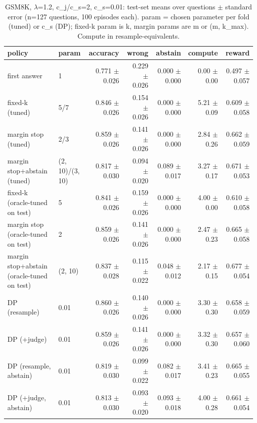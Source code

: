 \begin{table}[t]
\centering
\small
\caption{GSM8K, $\lambda$=1.2, c\_j/c\_s=2, c\_s=0.01: test-set means over questions $\pm$ standard error (n=127 questions, 100 episodes each). param = chosen parameter per fold (tuned) or c\_s (DP); fixed-k param is k, margin params are m or (m, k\_max). Compute in resample-equivalents.}
\label{tab:headline_gsm8k_lam1.2_jr2}
\begin{tabular}{llrrrrr}
\toprule
policy & param & accuracy & wrong & abstain & compute & reward \\
\midrule
first answer & 1 & 0.771 $\pm$ 0.026 & 0.229 $\pm$ 0.026 & 0.000 $\pm$ 0.000 & 0.00 $\pm$ 0.00 & 0.497 $\pm$ 0.057 \\
fixed-k (tuned) & 5/7 & 0.846 $\pm$ 0.026 & 0.154 $\pm$ 0.026 & 0.000 $\pm$ 0.000 & 5.21 $\pm$ 0.09 & 0.609 $\pm$ 0.058 \\
margin stop (tuned) & 2/3 & 0.859 $\pm$ 0.026 & 0.141 $\pm$ 0.026 & 0.000 $\pm$ 0.000 & 2.84 $\pm$ 0.26 & 0.662 $\pm$ 0.059 \\
margin stop+abstain (tuned) & (2, 10)/(3, 10) & 0.817 $\pm$ 0.030 & 0.094 $\pm$ 0.020 & 0.089 $\pm$ 0.017 & 3.27 $\pm$ 0.17 & 0.671 $\pm$ 0.053 \\
fixed-k (oracle-tuned on test) & 5 & 0.841 $\pm$ 0.026 & 0.159 $\pm$ 0.026 & 0.000 $\pm$ 0.000 & 4.00 $\pm$ 0.00 & 0.610 $\pm$ 0.058 \\
margin stop (oracle-tuned on test) & 2 & 0.859 $\pm$ 0.026 & 0.141 $\pm$ 0.026 & 0.000 $\pm$ 0.000 & 2.47 $\pm$ 0.23 & 0.665 $\pm$ 0.058 \\
margin stop+abstain (oracle-tuned on test) & (2, 10) & 0.837 $\pm$ 0.028 & 0.115 $\pm$ 0.022 & 0.048 $\pm$ 0.012 & 2.17 $\pm$ 0.15 & 0.677 $\pm$ 0.054 \\
DP (resample) & 0.01 & 0.860 $\pm$ 0.026 & 0.140 $\pm$ 0.026 & 0.000 $\pm$ 0.000 & 3.30 $\pm$ 0.30 & 0.658 $\pm$ 0.059 \\
DP (+judge) & 0.01 & 0.859 $\pm$ 0.026 & 0.141 $\pm$ 0.026 & 0.000 $\pm$ 0.000 & 3.32 $\pm$ 0.30 & 0.657 $\pm$ 0.060 \\
DP (resample, abstain) & 0.01 & 0.819 $\pm$ 0.030 & 0.099 $\pm$ 0.022 & 0.082 $\pm$ 0.017 & 3.41 $\pm$ 0.23 & 0.665 $\pm$ 0.055 \\
DP (+judge, abstain) & 0.01 & 0.813 $\pm$ 0.030 & 0.093 $\pm$ 0.020 & 0.093 $\pm$ 0.018 & 4.00 $\pm$ 0.28 & 0.661 $\pm$ 0.054 \\
\bottomrule
\end{tabular}
\end{table}
